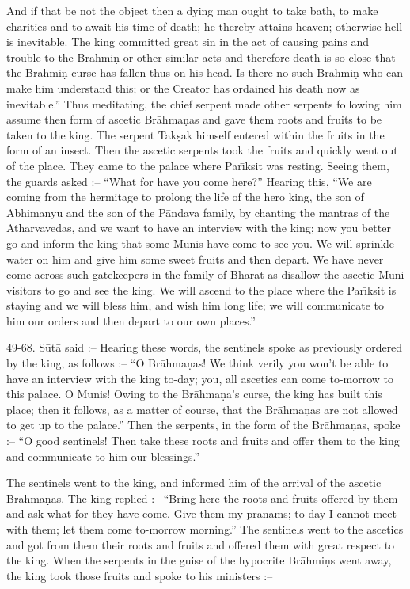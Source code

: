 And if that be not the object then a dying man ought to take bath, to make charities and to await his time of death; he thereby attains heaven; otherwise hell is inevitable. The king committed great sin in the act of causing pains and trouble to the Br\=ahmi\d{n} or other similar acts and therefore death is so close that the Br\=ahmi\d{n} curse has fallen thus on his head. Is there no such Br\=ahmi\d{n} who can make him understand this; or the Creator has ordained his death now as inevitable.'' Thus meditating, the chief serpent made other serpents following him assume then form of ascetic Br\=ahma\d{n}as and gave them roots and fruits to be taken to the king. The serpent Tak\d{s}ak himself entered within the fruits in the form of an insect. Then the ascetic serpents took the fruits and quickly went out of the place. They came to the palace where Par\={\i}ksit was resting. Seeing them, the guards asked :-- ``What for have you come here?'' Hearing this, ``We are coming from the hermitage to prolong the life of the hero king, the son of Abhimanyu and the son of the P\=andava family, by chanting the mantras of the Atharvavedas, and we want to have an interview with the king; now you better go and inform the king that some Munis have come to see you. We will sprinkle water on him and give him some sweet fruits and then depart. We have never come across such gatekeepers in the family of Bharat as disallow the ascetic Muni visitors to go and see the king. We will ascend to the place where the Par\={\i}ksit is staying and we will bless him, and wish him long life; we will communicate to him our orders and then depart to our own places.''

49-68. S\=ut\=a said :-- Hearing these words, the sentinels spoke as previously ordered by the king, as follows :-- ``O Br\=ahma\d{n}as! We think verily you won't be able to have an interview with the king to-day; you, all ascetics can come to-morrow to this palace. O Munis! Owing to the Br\=ahma\d{n}a's curse, the king has built this place; then it follows, as a matter of course, that the Br\=ahma\d{n}as are not allowed to get up to the palace.'' Then the serpents, in the form of the Br\=ahma\d{n}as, spoke :-- ``O good sentinels! Then take these roots and fruits and offer them to the king and communicate to him our blessings.''

The sentinels went to the king, and informed him of the arrival of the ascetic Br\=ahma\d{n}as. The king replied :-- ``Bring here the roots and fruits offered by them and ask what for they have come. Give them my pran\=ams; to-day I cannot meet with them; let them come to-morrow morning.'' The sentinels went to the ascetics and got from them their roots and fruits and offered them with great respect to the king. When the serpents in the guise of the hypocrite Br\=ahmi\d{n}s went away, the king took those fruits and spoke to his ministers :--

